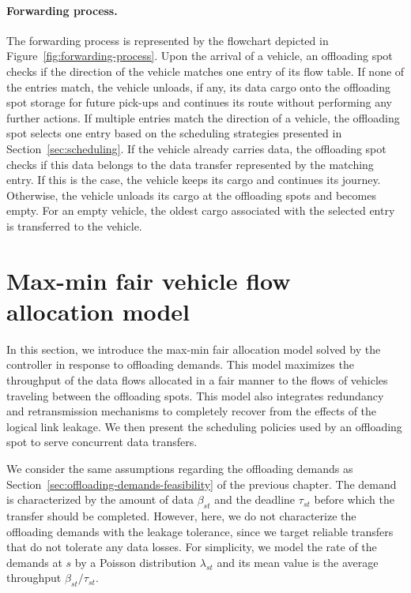 \paragraph{Forwarding process.} 
The forwarding process is represented by the flowchart depicted in Figure~\ref{fig:forwarding-process}. Upon the arrival of a vehicle, an offloading spot checks if the direction of the vehicle matches one entry of its flow table. If none of the entries match, the vehicle unloads, if any, its data cargo onto the offloading spot storage for future pick-ups and continues its route without performing any further actions. If multiple entries match the direction of a vehicle, the offloading spot selects one entry based on the scheduling strategies presented in Section~\ref{sec:scheduling}. If the vehicle already carries data, the offloading spot checks if this data belongs to the data transfer represented by the matching entry. If this is the case, the vehicle keeps its cargo and continues its journey. Otherwise, the vehicle unloads its cargo at the offloading spots and becomes empty. For an empty vehicle, the oldest cargo associated with the selected entry is transferred to the vehicle.


\section{Max-min fair vehicle flow allocation model}
\label{sec:max-min-fairness-allocation-model}

In this section, we introduce the max-min fair allocation model solved by the controller in response to offloading demands. This model maximizes the throughput of the data flows allocated in a fair manner to the flows of vehicles traveling between the offloading spots. This model also integrates redundancy and retransmission mechanisms to completely recover from the effects of the logical link leakage. We then present the scheduling policies used by an offloading spot to serve concurrent data transfers. 

We consider the same assumptions regarding the offloading demands as Section~\ref{sec:offloading-demands-feasibility} of the previous chapter. The demand is characterized by the amount of data $\beta_{st}$ and the deadline $\tau_{st}$ before which the transfer should be completed. However, here, we do not characterize the offloading demands with the leakage tolerance, since we target reliable transfers that do not tolerate any data losses. For simplicity, we model the rate of the demands at $s$ by a Poisson distribution $\lambda_{st}$ and its mean value is the average throughput $\beta_{st}/\tau_{st}$.

